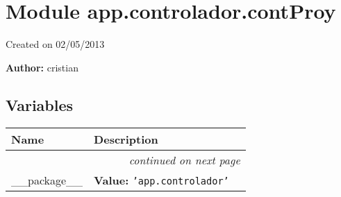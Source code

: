 %
%
%


\section{Module app.controlador.contProy}

    \label{app:controlador:contProy}
Created on 02/05/2013

\textbf{Author:} cristian





  \subsection{Variables}

    \vspace{-1cm}
\hspace{\varindent}\begin{longtable}{|p{\varnamewidth}|p{\vardescrwidth}|l}
\cline{1-2}
\cline{1-2} \centering \textbf{Name} & \centering \textbf{Description}& \\
\cline{1-2}
\endhead\cline{1-2}\multicolumn{3}{r}{\small\textit{continued on next page}}\\\endfoot\cline{1-2}
\endlastfoot\raggedright \_\-\_\-p\-a\-c\-k\-a\-g\-e\-\_\-\_\- & \raggedright \textbf{Value:} 
{\tt \texttt{'}\texttt{app.controlador}\texttt{'}}&\\
\cline{1-2}
\end{longtable}



